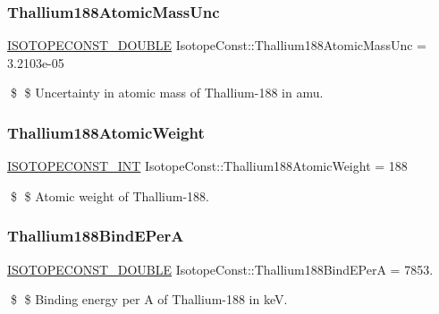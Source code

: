 \subsubsection{\texorpdfstring{Thallium188\+Atomic\+Mass\+Unc}{Thallium188AtomicMassUnc}}
{\footnotesize\ttfamily \mbox{\hyperlink{group___isotope_const-_macros_ga8f45a7272ce02c0b4c65c44636ed719a}{I\+S\+O\+T\+O\+P\+E\+C\+O\+N\+S\+T\+\_\+\+D\+O\+U\+B\+LE}} Isotope\+Const\+::\+Thallium188\+Atomic\+Mass\+Unc = 3.\+2103e-\/05}

\$ \$ Uncertainty in atomic mass of Thallium-\/188 in amu. \mbox{\label{group___isotope_const-_thallium-_tl188_ga4dd973ca304aef12419c7706b3778595}} 
\subsubsection{\texorpdfstring{Thallium188\+Atomic\+Weight}{Thallium188AtomicWeight}}
{\footnotesize\ttfamily \mbox{\hyperlink{group___isotope_const-_macros_ga5f18360b3e99483a35c32d789e62621c}{I\+S\+O\+T\+O\+P\+E\+C\+O\+N\+S\+T\+\_\+\+I\+NT}} Isotope\+Const\+::\+Thallium188\+Atomic\+Weight = 188}

\$ \$ Atomic weight of Thallium-\/188. \mbox{\label{group___isotope_const-_thallium-_tl188_ga85a2cff7e100e1e04d986dc15a48d6c7}} 
\subsubsection{\texorpdfstring{Thallium188\+Bind\+E\+PerA}{Thallium188BindEPerA}}
{\footnotesize\ttfamily \mbox{\hyperlink{group___isotope_const-_macros_ga8f45a7272ce02c0b4c65c44636ed719a}{I\+S\+O\+T\+O\+P\+E\+C\+O\+N\+S\+T\+\_\+\+D\+O\+U\+B\+LE}} Isotope\+Const\+::\+Thallium188\+Bind\+E\+PerA = 7853.}

\$ \$ Binding energy per A of Thallium-\/188 in keV. \mbox{\label{group___isotope_const-_thallium-_tl188_ga0d7f3ceebbcfb91a336722d5d917baa0}} 
